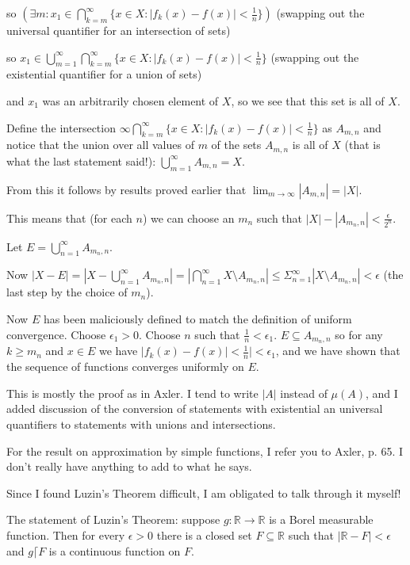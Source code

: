 \documentclass[12pt]{article}
\begin{document}
so $(\exists m:x_1 \in \bigcap_{k=m}^\infty \{x \in X:|f_k(x)-f(x)|<\frac1n\})$  (swapping out the universal quantifier for an intersection of sets)

so $x_1 \in \bigcup_{m=1}^\infty\bigcap_{k=m}^\infty \{x \in X:|f_k(x)-f(x)|<\frac1n\}$ (swapping out the existential quantifier for a union of sets)

and $x_1$ was an arbitrarily chosen element of $X$, so we see that this set is all of $X$.

Define the intersection $\infty\bigcap_{k=m}^\infty \{x \in X:|f_k(x)-f(x)|<\frac1n\}$ as $A_{m,n}$ and notice that the union over all values
of $m$ of the sets $A_{m,n}$ is all of $X$ (that is what the last statement said!):  $\bigcup_{m=1}^\infty A_{m,n} = X$.

From this it follows by results proved earlier that $\lim_{m \rightarrow \infty} |A_{m,n}| = |X|$.

This means that (for each $n$) we can choose an $m_n$ such that $|X| - |A_{m_n,n}| < \frac\epsilon{2^n}$.

Let $E = \bigcup_{n=1}^\infty A_{m_n,n}$.

Now $|X-E| = |X - \bigcup_{n=1}^\infty A_{m_n,n}| = |\bigcap_{n=1}^\infty X \setminus A_{m_n,n}| \leq \Sigma_{n=1}^\infty |X \setminus A_{m_n,n}| <\epsilon$ (the last step by the choice of $m_n$).

Now $E$ has been maliciously defined to match the definition of uniform convergence.  Choose $\epsilon_1>0$.  Choose $n$ such that
$\frac1n<\epsilon_1$.  $E\subseteq A_{m_n,n}$ so for any $k \geq m_n$ and $x \in E$ we have $|f_k(x)-f(x)|<\frac1n|<\epsilon_1$, and we have shown that the sequence of functions converges uniformly on $E$.

This is mostly the proof as in Axler.  I tend to write $|A|$ instead of $\mu(A)$, and I added discussion of the conversion of statements with existential an universal quantifiers to statements with unions and intersections.

For the result on approximation by simple functions, I refer you to Axler, p. 65.  I don't really have anything to add to what he says.

Since I found Luzin's Theorem difficult, I am obligated to talk through it myself!

The statement of Luzin's Theorem:  suppose $g:\mathbb R \rightarrow \mathbb R$ is a Borel measurable function.  Then for every $\epsilon>0$ there is  a closed set $F \subseteq \mathbb R$ such that $|\mathbb R - F|<\epsilon$ and $g \lceil F$ is a continuous function on $F$.
\end{document}
